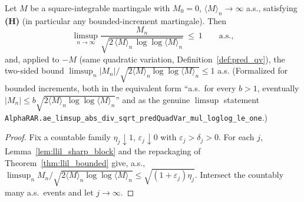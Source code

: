 \begin{theorem}\label{thm:llil_sharp}
\leanok
{}
Let $M$ be a square-integrable martingale with $M_0=0$, $\langle M\rangle_n\to\infty$
a.s., satisfying \textbf{(H)} (in particular any bounded-increment martingale). Then
\[
  \limsup_{n\to\infty}\frac{M_n}{\sqrt{2\,\langle M\rangle_n\,\log\log\langle M\rangle_n}}
  \ \le\ 1\qquad\text{a.s.},
\]
and, applied to $-M$ (same quadratic variation, Definition~\ref{def:pred_qv}), the two-sided
bound $\limsup_n|M_n|/\sqrt{2\langle M\rangle_n\log\log\langle M\rangle_n}\le1$ a.s.
(Formalized for bounded increments, both in the equivalent form ``a.s.\ for every $b>1$, eventually
$|M_n|\le b\sqrt{2\langle M\rangle_n\log\log\langle M\rangle_n}$'' and as the genuine
$\limsup$ statement \texttt{AlphaRAR.ae\_limsup\_abs\_div\_sqrt\_predQuadVar\_mul\_loglog\_le\_one}.)
\end{theorem}
\begin{proof}
Fix a countable family $\eta_j\downarrow1$, $\varepsilon_j\downarrow0$ with
$\varepsilon_j>\delta_j>0$. For each $j$, Lemma~\ref{lem:llil_sharp_block} and the
repackaging of Theorem~\ref{thm:llil_bounded} give, a.s.,
$\limsup_n M_n/\sqrt{2\langle M\rangle_n\log\log\langle M\rangle_n}\le
\sqrt{(1+\varepsilon_j)\eta_j}$. Intersect the countably many a.s.\ events and let
$j\to\infty$.
\end{proof}

